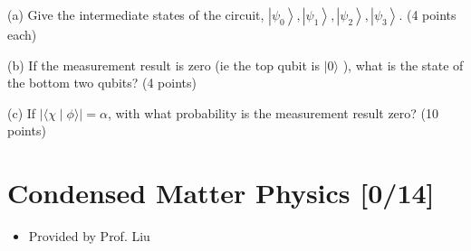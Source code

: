 \documentclass[11pt]{article}
\begin{document}
(a) Give the intermediate states of the circuit,
\(\left|\psi_0\right\rangle,\left|\psi_1\right\rangle,\left|\psi_2\right\rangle,\left|\psi_3\right\rangle\).
(4 points each)

(b) If the measurement result is zero (ie the top qubit is \(|0\rangle\) ), what
is the state of the bottom two qubits? (4 points)

(c) If \(|\langle\chi \mid \phi\rangle|=\alpha\), with what probability is the
measurement result zero? (10 points)
\section{Condensed Matter Physics [0/14]}
\label{sec:orged0e469}
\begin{itemize}
\item Provided by Prof. Liu
\end{itemize}
\end{document}
